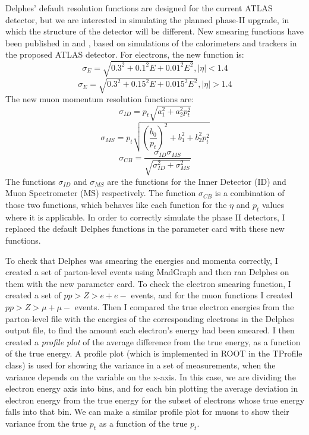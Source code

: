 \documentclass[10pt]{ucscthesisbs}
\begin{document}
Delphes' default resolution functions are designed for the current ATLAS detector, but we are interested in simulating the planned phase-II upgrade, in which the structure of the detector will be different. New smearing functions have been published in \cite{ATLASElectronRes} and \cite{ATLASMuonRes}, based on simulations of the calorimeters and trackers in the proposed ATLAS detector. For electrons, the new function is:
\begin{equation} \label{eq:NewElectronRes}
\sigma_E = \sqrt{0.3^2 + 0.1^2E + 0.01^2E^2}, |\eta| < 1.4
\end{equation}
\begin{equation}
\sigma_E = \sqrt{0.3^2 + 0.15^2E + 0.015^2E^2}, |\eta| > 1.4
\end{equation}
The new muon momentum resolution functions are:
\begin{equation} \label{eq:sigmaID}
\sigma_{ID} = p_t \sqrt{a_1^2 + a_2^2p_t^2}
\end{equation}
\begin{equation} \label{eq:sigmaMS}
\sigma_{MS} = p_t\sqrt{(\frac{b_0}{p_t})^2 + b_1^2 + b_2^2p_t^2}
\end{equation}
\begin{equation} \label{eq:sigmaCB}
\sigma_{CB} = \frac{\sigma_{ID}\sigma_{MS}}{\sqrt{\sigma_{ID}^2 + \sigma_{MS}^2}}
\end{equation}
The functions $\sigma_{ID}$ and $\sigma_{MS}$ are the functions for the Inner Detector (ID) and Muon Spectrometer (MS) respectively. The function $\sigma_{CB}$ is a combination of those two functions, which behaves like each function for the $\eta$ and $p_t$ values where it is applicable. In order to correctly simulate the phase II detectors, I replaced the default Delphes functions in the parameter card with these new functions. \par
To check that Delphes was smearing the energies and momenta correctly, I created a set of parton-level events using MadGraph and then ran Delphes on them with the new parameter card. To check the electron smearing function, I created a set of $p p > Z > e+ e-$ events, and for the muon functions I created $p p > Z > \mu+ \mu-$ events. Then I compared the true electron energies from the parton-level file with the energies of the corresponding electrons in the Delphes output file, to find the amount each electron's energy had been smeared. I then created a \textit{profile plot} of the average difference from the true energy, as a function of the true energy. A profile plot (which is implemented in ROOT in the TProfile class) is used for showing the variance in a set of measurements, when the variance depends on the variable on the x-axis. In this case, we are dividing the electron energy axis into bins, and for each bin plotting the average deviation in electron energy from the true energy for the subset of electrons whose true energy falls into that bin. We can make a similar profile plot for muons to show their variance from the true $p_t$ as a function of the true $p_t$. \par
\end{document}
